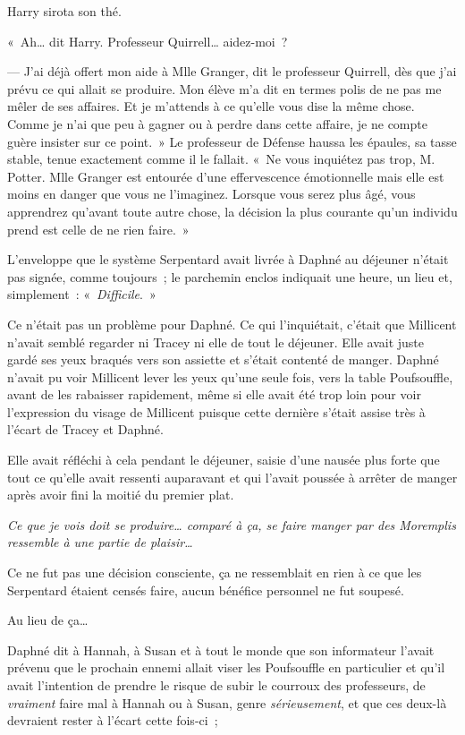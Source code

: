 Harry sirota son thé.

«~Ah… dit Harry.
Professeur Quirrell… aidez-moi~?

--- J'ai déjà offert mon aide à Mlle Granger, dit le professeur Quirrell, dès que j'ai prévu ce qui allait se produire.
Mon élève m'a dit en termes polis de ne pas me mêler de ses affaires.
Et je m'attends à ce qu'elle vous dise la même chose.
Comme je n'ai que peu à gagner ou à perdre dans cette affaire, je ne compte guère insister sur ce point.~»
Le professeur de Défense haussa les épaules, sa tasse stable, tenue exactement comme il le fallait.
«~Ne vous inquiétez pas trop, M. Potter.
Mlle Granger est entourée d'une effervescence émotionnelle mais elle est moins en danger que vous ne l'imaginez.
Lorsque vous serez plus âgé, vous apprendrez qu'avant toute autre chose, la décision la plus courante qu'un individu prend est celle de ne rien faire.~»

\later

L'enveloppe que le système Serpentard avait livrée à Daphné au déjeuner n'était pas signée, comme toujours~; le parchemin enclos indiquait une heure, un lieu et, simplement~: «~\emph{Difficile}.~»

Ce n'était pas un problème pour Daphné.
Ce qui l'inquiétait, c'était que Millicent n'avait semblé regarder ni Tracey ni elle de tout le déjeuner.
Elle avait juste gardé ses yeux braqués vers son assiette et s'était contenté de manger.
Daphné n'avait pu voir Millicent lever les yeux qu'une seule fois, vers la table Poufsouffle, avant de les rabaisser rapidement, même si elle avait été trop loin pour voir l'expression du visage de Millicent puisque cette dernière s'était assise très à l'écart de Tracey et Daphné.

Elle avait réfléchi à cela pendant le déjeuner, saisie d'une nausée plus forte que tout ce qu'elle avait ressenti auparavant et qui l'avait poussée à arrêter de manger après avoir fini la moitié du premier plat.

\emph{Ce que je vois doit se produire… comparé à ça, se faire manger par des Moremplis ressemble à une partie de plaisir…}

Ce ne fut pas une décision consciente, ça ne ressemblait en rien à ce que les Serpentard étaient censés faire, aucun bénéfice personnel ne fut soupesé.

Au lieu de ça…

Daphné dit à Hannah, à Susan et à tout le monde que son informateur l'avait prévenu que le prochain ennemi allait viser les Poufsouffle en particulier et qu'il avait l'intention de prendre le risque de subir le courroux des professeurs, de \emph{vraiment} faire mal à Hannah ou à Susan, genre \emph{sérieusement}, et que ces deux-là devraient rester à l'écart cette fois-ci~;

